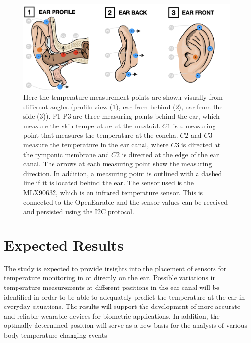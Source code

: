 \begin{figure}
    \centering
    \includegraphics[scale=0.26]{thesis-doc/images/ear_measurement_points/emp.png}
    \caption{Here the temperature measurement points are shown visually from different angles (profile view (1), ear from behind (2), ear from the side (3)). P1-P3 are three measuring points behind the ear, which measure the skin temperature at the mastoid. $C1$ is a measuring point that measures the temperature at the concha. $C2$ and $C3$ measure the temperature in the ear canal, where $C3$ is directed at the tympanic membrane and $C2$ is directed at the edge of the ear canal. The arrows at each measuring point show the measuring direction. In addition, a measuring point is outlined with a dashed line if it is located behind the ear. The sensor used is the MLX90632, which is an infrared temperature sensor. This is connected to the OpenEarable and the sensor values can be received and persisted using the I2C protocol.}
    \label{fig:ear_measurement_positions}
\end{figure}

\section{Expected Results}
\label{ch:Introduction:ExpectedResults}
The study is expected to provide insights into the placement of sensors for temperature monitoring in or directly on the ear.
Possible variations in temperature measurements at different positions in the ear canal will be identified in order to be able to adequately predict the temperature at the ear in everyday situations.
The results will support the development of more accurate and reliable wearable devices for biometric applications. 
In addition, the optimally determined position will serve as a new basis for the analysis of various body temperature-changing events.